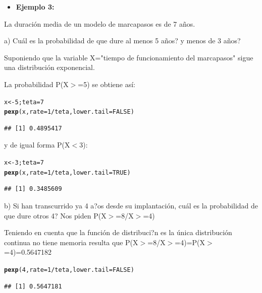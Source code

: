 \documentclass[12pt,letterpaper]{article}\usepackage[]{graphicx}\usepackage[]{color}
\makeatletter
\newcommand{\hlnum}[1]{\textcolor[rgb]{0.686,0.059,0.569}{#1}}%
\newcommand{\hlopt}[1]{\textcolor[rgb]{0,0,0}{#1}}%
\newcommand{\hlstd}[1]{\textcolor[rgb]{0.345,0.345,0.345}{#1}}%
\newcommand{\hlkwb}[1]{\textcolor[rgb]{0.69,0.353,0.396}{#1}}%
\newcommand{\hlkwc}[1]{\textcolor[rgb]{0.333,0.667,0.333}{#1}}%
\newcommand{\hlkwd}[1]{\textcolor[rgb]{0.737,0.353,0.396}{\textbf{#1}}}%
\newenvironment{kframe}{%
 \def\at@end@of@kframe{}%
 \ifinner\ifhmode%
  \def\at@end@of@kframe{\end{minipage}}%
  \begin{minipage}{\columnwidth}%
 \fi\fi%
 \def\FrameCommand##1{\hskip\@totalleftmargin \hskip-\fboxsep
 \colorbox{shadecolor}{##1}\hskip-\fboxsep
     \hskip-\linewidth \hskip-\@totalleftmargin \hskip\columnwidth}%
 \MakeFramed {\advance\hsize-\width
   \@totalleftmargin\z@ \linewidth\hsize
   \@setminipage}}%
 {\par\unskip\endMakeFramed%
 \at@end@of@kframe}
\newenvironment{knitrout}{}{} %
\makeatother
\begin{document}
\begin{itemize}
  \item \textbf{Ejemplo 3:}
\end{itemize}
La duraci\'on media de un modelo de marcapasos es de 7 a\~nos. 
\begin{description}
  \item a) Cu\'al es la probabilidad de que dure al menos 5 a\~nos? y menos de 3 a\~nos?
  
Suponiendo que la variable X="tiempo de funcionamiento del marcapasos" sigue una distribuci\'on exponencial.

La probabilidad P(X$>$=5) se obtiene as\'i:
\begin{knitrout}
\color{fgcolor}\begin{kframe}
\begin{alltt}
\hlstd{x} \hlkwb{<-} \hlnum{5}\hlstd{; teta}\hlkwb{=}\hlnum{7}
\hlkwd{pexp}\hlstd{(x,} \hlkwc{rate}\hlstd{=}\hlnum{1}\hlopt{/}\hlstd{teta,} \hlkwc{lower.tail}\hlstd{=}\hlnum{FALSE}\hlstd{)}
\end{alltt}
\begin{verbatim}
## [1] 0.4895417
\end{verbatim}
\end{kframe}
\end{knitrout}

y de igual forma  P(X$<$3): 
\begin{knitrout}
\color{fgcolor}\begin{kframe}
\begin{alltt}
\hlstd{x} \hlkwb{<-} \hlnum{3}\hlstd{; teta}\hlkwb{=}\hlnum{7}
\hlkwd{pexp}\hlstd{(x,} \hlkwc{rate}\hlstd{=}\hlnum{1}\hlopt{/}\hlstd{teta,} \hlkwc{lower.tail}\hlstd{=}\hlnum{TRUE}\hlstd{)}
\end{alltt}
\begin{verbatim}
## [1] 0.3485609
\end{verbatim}
\end{kframe}
\end{knitrout}


  \item b) Si han transcurrido ya 4 a?os desde su implantaci\'on, cu\'al es la probabilidad de que dure otros 4? Nos piden P(X$>$=8/X$>$=4)
  
Teniendo en cuenta que la funci\'on de distribuci?n es la \'unica distribuci\'on continua no tiene memoria resulta que P(X$>$=8/X$>$=4)=P(X$>$=4)=0.5647182
\begin{knitrout}
\color{fgcolor}\begin{kframe}
\begin{alltt}
\hlkwd{pexp}\hlstd{(}\hlnum{4}\hlstd{,} \hlkwc{rate}\hlstd{=}\hlnum{1}\hlopt{/}\hlstd{teta,} \hlkwc{lower.tail}\hlstd{=}\hlnum{FALSE}\hlstd{)}
\end{alltt}
\begin{verbatim}
## [1] 0.5647181
\end{verbatim}
\end{kframe}
\end{knitrout}


\end{description}
\end{document}
